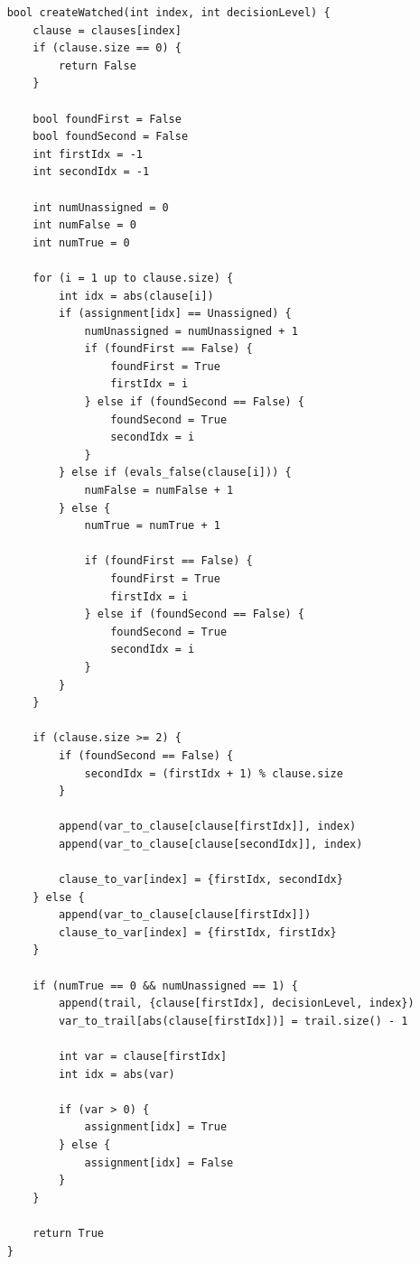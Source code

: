 \documentclass[oneside]{book}
\begin{document}
\begin{lstlisting}
    bool createWatched(int index, int decisionLevel) {
        clause = clauses[index]
        if (clause.size == 0) {
            return False
        }

        bool foundFirst = False 
        bool foundSecond = False 
        int firstIdx = -1
        int secondIdx = -1

        int numUnassigned = 0
        int numFalse = 0
        int numTrue = 0

        for (i = 1 up to clause.size) {
            int idx = abs(clause[i])
            if (assignment[idx] == Unassigned) {
                numUnassigned = numUnassigned + 1
                if (foundFirst == False) {
                    foundFirst = True
                    firstIdx = i
                } else if (foundSecond == False) {
                    foundSecond = True 
                    secondIdx = i
                }
            } else if (evals_false(clause[i])) {
                numFalse = numFalse + 1
            } else {
                numTrue = numTrue + 1

                if (foundFirst == False) {
                    foundFirst = True
                    firstIdx = i
                } else if (foundSecond == False) {
                    foundSecond = True 
                    secondIdx = i
                }
            }
        }

        if (clause.size >= 2) {
            if (foundSecond == False) {
                secondIdx = (firstIdx + 1) % clause.size
            }

            append(var_to_clause[clause[firstIdx]], index)
            append(var_to_clause[clause[secondIdx]], index)
            
            clause_to_var[index] = {firstIdx, secondIdx}
        } else {
            append(var_to_clause[clause[firstIdx]])
            clause_to_var[index] = {firstIdx, firstIdx}
        }

        if (numTrue == 0 && numUnassigned == 1) {
            append(trail, {clause[firstIdx], decisionLevel, index})
            var_to_trail[abs(clause[firstIdx])] = trail.size() - 1

            int var = clause[firstIdx]
            int idx = abs(var)

            if (var > 0) {
                assignment[idx] = True
            } else {
                assignment[idx] = False
            }
        }

        return True
    }
\end{lstlisting}
\end{document}
